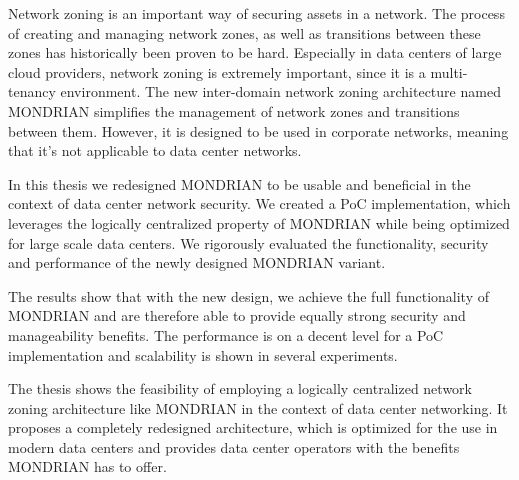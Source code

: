  Network zoning is an important way of securing assets in a network. The process of creating and managing network zones, as well as transitions between these zones has historically been proven to be hard. Especially in data centers of large cloud providers, network zoning is extremely important, since it is a multi-tenancy environment. The new inter-domain network zoning architecture named MONDRIAN simplifies the management of network zones and transitions between them. However, it is designed to be used in corporate networks, meaning that it’s not applicable to data center networks. 

 
 In this thesis we redesigned MONDRIAN to be usable and beneficial in the context of data center network security. We created a \acl{PoC} implementation, which leverages the logically centralized property of MONDRIAN while being optimized for large scale data centers. We rigorously evaluated the functionality, security and performance of the newly designed MONDRIAN variant.


 The results show that with the new design, we achieve the full functionality of MONDRIAN and are therefore able to provide equally strong security and manageability benefits. The performance is on a decent level for a \acl{PoC} implementation and scalability is shown in several experiments.
 
 The thesis shows the feasibility of employing a logically centralized network zoning architecture like MONDRIAN in the context of data center networking. It proposes a completely redesigned architecture, which is optimized for the use in modern data centers and provides data center operators with the benefits MONDRIAN has to offer.